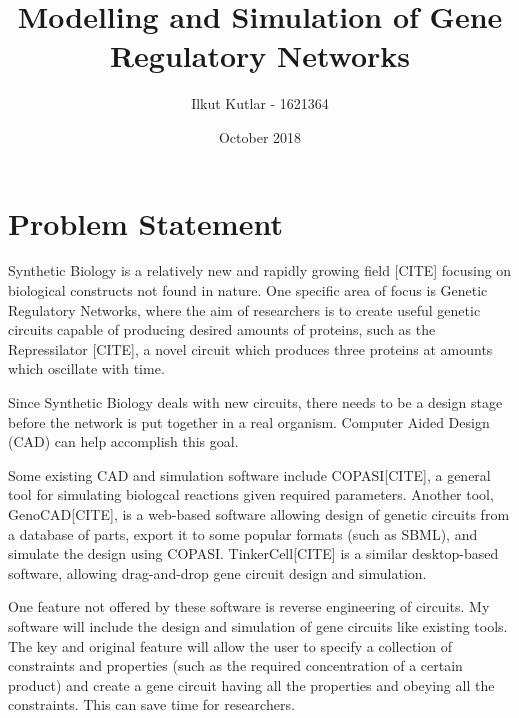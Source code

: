 \documentclass{article}
\title{Modelling and Simulation of Gene Regulatory Networks}
\author{Ilkut Kutlar - 1621364}
\date{October 2018}
\begin{document}
	\maketitle
	
	\section{Problem Statement}
	
	\par Synthetic Biology is a relatively new and rapidly growing field [CITE] focusing on biological constructs not found in nature. One specific area of focus is Genetic Regulatory Networks, where the aim of researchers is to create useful genetic circuits capable of producing desired amounts of proteins, such as the Repressilator [CITE], a novel circuit which produces three proteins at amounts which oscillate with time.
	\par Since Synthetic Biology deals with new circuits, there needs to be a design stage before the network is put together in a real organism. Computer Aided Design (CAD) can help accomplish this goal.
	\par Some existing CAD and simulation software include COPASI[CITE], a general tool for simulating biologcal reactions given required parameters. Another tool, GenoCAD[CITE], is a web-based software allowing design of genetic circuits from a database of parts, export it to some popular formats (such as SBML), and simulate the design using COPASI. TinkerCell[CITE] is a similar desktop-based software, allowing drag-and-drop gene circuit design and simulation.
	\par One feature not offered by these software is reverse engineering of circuits. My software will include the design and simulation of gene circuits like existing tools. The key and original feature will allow the user to specify a collection of constraints and properties (such as the required concentration of a certain product) and create a gene circuit having all the properties and obeying all the constraints. This can save time for researchers.
	
	
	
\end{document}
